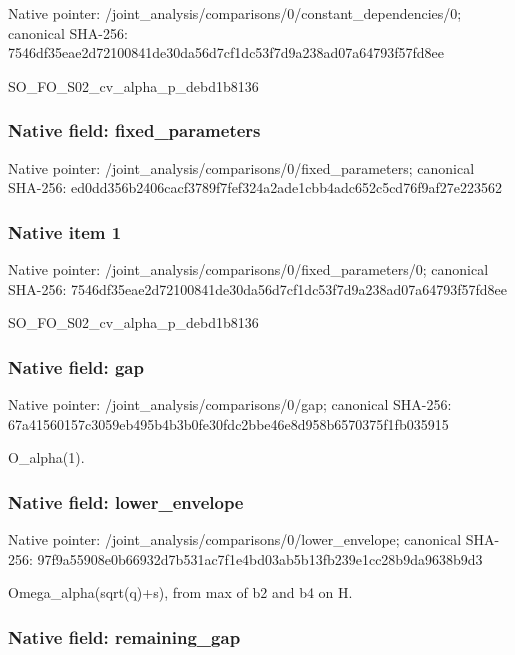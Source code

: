 \documentclass[10pt,a4paper]{article}
\begin{document}
Native pointer: /joint\_analysis/comparis\allowbreak{}ons/0/constant\_dependenc\allowbreak{}ies/0; canonical SHA-256: 7546df35eae2d72100841de3\allowbreak{}0da56d7cf1dc53f7d9a238ad\allowbreak{}07a64793f57fd8ee


SO\_FO\_S02\_cv\_alpha\_p\_debd1b8136


\subsubsection{Native field: fixed\_parameters}


Native pointer: /joint\_analysis/comparis\allowbreak{}ons/0/fixed\_parameters; canonical SHA-256: ed0dd356b2406cacf3789f7f\allowbreak{}ef324a2ade1cbb4adc652c5c\allowbreak{}d76f9af27e223562



\subsubsection{Native item 1}


Native pointer: /joint\_analysis/comparis\allowbreak{}ons/0/fixed\_parameters/0; canonical SHA-256: 7546df35eae2d72100841de3\allowbreak{}0da56d7cf1dc53f7d9a238ad\allowbreak{}07a64793f57fd8ee


SO\_FO\_S02\_cv\_alpha\_p\_debd1b8136


\subsubsection{Native field: gap}


Native pointer: /joint\_analysis/comparisons/0/gap; canonical SHA-256: 67a41560157c3059eb495b4b\allowbreak{}3b0fe30fdc2bbe46e8d958b6\allowbreak{}570375f1fb035915


O\_alpha(1).


\subsubsection{Native field: lower\_envelope}


Native pointer: /joint\_analysis/comparis\allowbreak{}ons/0/lower\_envelope; canonical SHA-256: 97f9a55908e0b66932d7b531\allowbreak{}ac7f1e4bd03ab5b13fb239e1\allowbreak{}cc28b9da9638b9d3


Omega\_alpha(sqrt(q)+s), from max of b2 and b4 on H.


\subsubsection{Native field: remaining\_gap}
\end{document}
